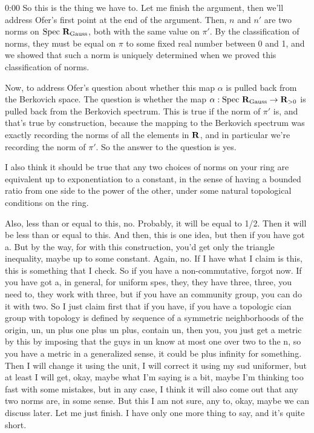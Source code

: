\begin{unfinished}{0:00}
So this is the thing we have to. Let me finish the argument, then we'll address Ofer's first point at the end of the argument. Then, $n$ and $n'$ are two norms on $\mathrm{Spec}\ \R_{\text{Gauss}}$, both with the same value on $\pi'$. By the classification of norms, they must be equal on $\pi$ to some fixed real number between 0 and 1, and we showed that such a norm is uniquely determined when we proved this classification of norms.

Now, to address Ofer's question about whether this map $\alpha$ is pulled back from the Berkovich space. The question is whether the map $\alpha: \mathrm{Spec}\ \mathbf R_{\text{Gauss}} \to \mathbf R_{>0}$ is pulled back from the Berkovich spectrum. This is true if the norm of $\pi'$ is, and that's true by construction, because the mapping to the Berkovich spectrum was exactly recording the norms of all the elements in $\mathbf R$, and in particular we're recording the norm of $\pi'$. So the answer to the question is yes.

I also think it should be true that any two choices of norms on your ring are equivalent up to exponentiation to a constant, in the sense of having a bounded ratio from one side to the power of the other, under some natural topological conditions on the ring.

Also, less than or equal to this, no. Probably, it will be equal to 1/2. Then it will be less than or equal to this. And then, this is one idea, but then if you have got a. But by the way, for with this construction, you'd get only the triangle inequality, maybe up to some constant. Again, no. If I have what I claim is this, this is something that I check. So if you have a non-commutative, forgot now. If you have got a, in general, for uniform spes, they, they have three, three, you need to, they work with three, but if you have an community group, you can do it with two. So I just claim first that if you have, if you have a topologic cian group with topology is defined by sequence of a symmetric neighborhoods of the origin, un, un plus one plus un plus, contain un, then you, you just get a metric by this by imposing that the guys in un know at most one over two to the n, so you have a metric in a generalized sense, it could be plus infinity for something. Then I will change it using the unit, I will correct it using my sud uniformer, but at least I will get, okay, maybe what I'm saying is a bit, maybe I'm thinking too fast with some mistakes, but in any case, I think it will also come out that any two norms are, in some sense. But this I am not sure, any to, okay, maybe we can discuss later. Let me just finish. I have only one more thing to say, and it's quite short.


\end{unfinished}
